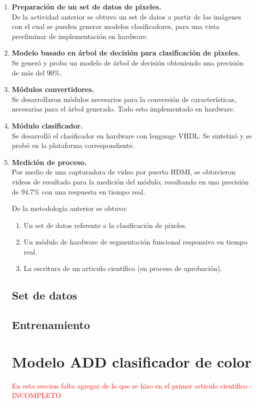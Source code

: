 \documentclass[twoside,spanish,ESP,MSc]{plantillaLabUPV}
\theoremstyle{definition}
\begin{document}
\begin{enumerate}
	\item \textbf{Preparación de un set de datos de pixeles.}\\
	De la actividad anterior se obtuvo un set de datos a partir de las imágenes con el cual se pueden generar modelos clasificadores, para una vista preeliminar de implementación en hardware.
	\item \textbf{Modelo basado en árbol de decisión para clasificación de pixeles.}\\
	Se generó y probo un modelo de árbol de decisión obteniendo una precisión de más del 90\%.
	\item \textbf{Módulos convertidores.}\\
	Se desarrollaron módulos necesarios para la conversión de características, necesarias para el árbol generado. Todo esto implementado en hardware.
	\item \textbf{Módulo clasificador.}\\
	Se desarrolló el clasificador en hardware con lenguage VHDL. Se sintetizó y se probó en la plataforma correspondiente.
	\item \textbf{Medición de proceso.}\\
	Por medio de una capturadora de video por puerto HDMI, se obtuvieron videos de resultado para la medición del módulo, resultando en una precisión de 94.7\% con una respuesta en tiempo real.
	
	De la metodología anterior se obtuvo:
	
	\begin{enumerate}
		\item Un set de datos referente a la clasificación de pixeles.
		\item Un módulo de hardware de segmentación funcional responsivo en tiempo real.
		\item La escritura de un articulo científico (en proceso de aprobación).
	\end{enumerate}
	\subsection{Set de datos}
	\subsection{Entrenamiento}
	
	\section{Modelo ADD clasificador de color}
	\textcolor{red}{En esta seccion falta agregar de lo que se hizo en el primer articulo cientifico - INCOMPLETO}
	

\end{enumerate}
\end{document}
